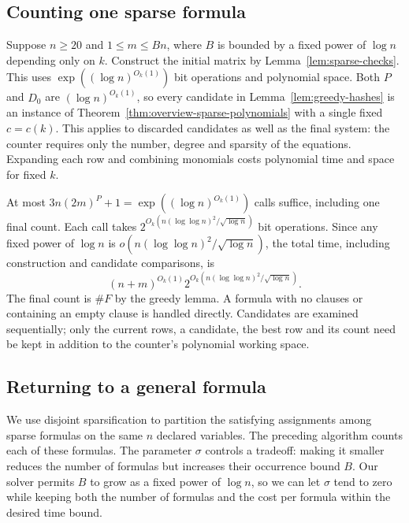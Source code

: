 \documentclass[11pt,reqno]{amsart}
\numberwithin{equation}{section}
\theoremstyle{definition}\newtheorem{definition}[theorem]{Definition}
\theoremstyle{remark}\newtheorem{remark}[theorem]{Remark}
\renewcommand{\le}{\leqslant}
\renewcommand{\ge}{\geqslant}
\begin{document}
\subsection{Counting one sparse formula}\label{subsec:count-sparse}
Suppose $n\ge20$ and $1\le m\le Bn$, where $B$ is bounded by a fixed
power of $\log n$ depending only on $k$. Construct the initial matrix
by Lemma~\ref{lem:sparse-checks}. This uses
$\exp((\log n)^{O_k(1)})$ bit operations and polynomial space.
Both $P$ and $D_0$ are $(\log n)^{O_k(1)}$, so every candidate in
Lemma~\ref{lem:greedy-hashes} is an instance of
Theorem~\ref{thm:overview-sparse-polynomials} with a single fixed
$c=c(k)$. This applies to discarded candidates as well as the final
system: the counter requires only the number, degree and sparsity of
the equations. Expanding each row and combining monomials costs
polynomial time and space for fixed $k$.

At most $3n(2m)^P+1=\exp((\log n)^{O_k(1)})$ calls suffice, including
one final count. Each call takes
$2^{O_k(n(\log\log n)^2/\sqrt{\log n})}$ bit operations. Since any
fixed power of $\log n$ is $o(n(\log\log n)^2/\sqrt{\log n})$, the
total time, including construction and candidate comparisons, is
\begin{equation}\label{eq:sparse-formula-cost}
 (n+m)^{O_k(1)}2^{O_k(n(\log\log n)^2/\sqrt{\log n})}.
\end{equation}
The final count is $\#F$ by the greedy lemma. A formula with no clauses
or containing an empty clause is handled directly. Candidates are
examined sequentially; only the current rows, a candidate, the best
row and its count need be kept in addition to the counter's polynomial
working space.

\subsection{Returning to a general formula}\label{subsec:general-reduction}

We use disjoint sparsification to partition the satisfying
assignments among sparse formulas on the same $n$ declared
variables. The preceding algorithm counts each of these formulas.
The parameter $\sigma$ controls a tradeoff: making it smaller reduces
the number of formulas but increases their occurrence bound $B$.
Our solver permits $B$ to grow as a fixed power of $\log n$, so we
can let $\sigma$ tend to zero while keeping both the number of
formulas and the cost per formula within the desired time bound.
\end{document}
